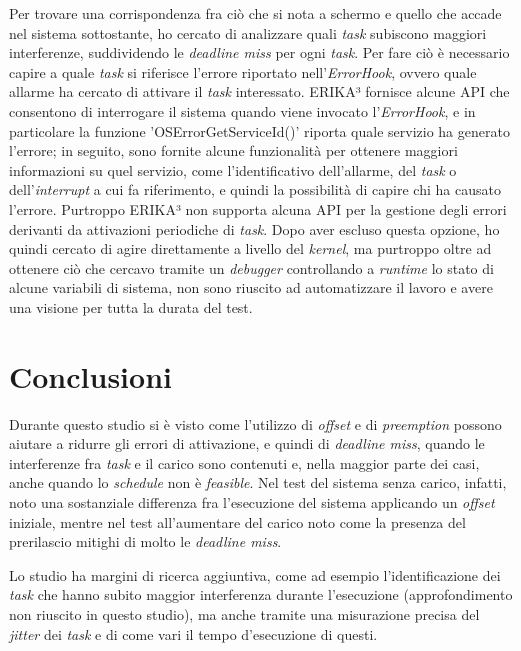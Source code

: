 \documentclass{article}
\begin{document}
Per trovare una corrispondenza fra ciò che si nota a schermo e quello che accade nel sistema sottostante, ho cercato di analizzare quali \textit{task} subiscono maggiori interferenze, suddividendo le \textit{deadline miss} per ogni \textit{task}. 
Per fare ciò è necessario capire a quale \textit{task} si riferisce l'errore riportato nell'\textit{ErrorHook}, ovvero quale allarme ha cercato di attivare il \textit{task} interessato. ERIKA³ fornisce alcune API che consentono di interrogare il sistema quando viene invocato l'\textit{ErrorHook}, e in particolare la funzione 'OSErrorGetServiceId()' riporta quale servizio ha generato l'errore; in seguito, sono fornite alcune funzionalità per ottenere maggiori informazioni su quel servizio, come l'identificativo dell'allarme, del \textit{task} o dell'\textit{interrupt} a cui fa riferimento, e quindi la possibilità di capire chi ha causato l'errore. Purtroppo ERIKA³ non supporta alcuna API per la gestione degli errori derivanti da attivazioni periodiche di \textit{task}. Dopo aver escluso questa opzione, ho quindi cercato di agire direttamente a livello del \textit{kernel}, ma purtroppo oltre ad ottenere ciò che cercavo tramite un \textit{debugger} controllando a \textit{runtime} lo stato di alcune variabili di sistema, non sono riuscito ad automatizzare il lavoro e avere una visione per tutta la durata del test.

\section{Conclusioni}
Durante questo studio si è visto come l'utilizzo di \textit{offset} e di \textit{preemption} possono aiutare a ridurre gli errori di attivazione, e quindi di \textit{deadline miss}, quando le interferenze fra \textit{task} e il carico sono contenuti e, nella maggior parte dei casi, anche quando lo \textit{schedule} non è \textit{feasible}. Nel test del sistema senza carico, infatti, noto una sostanziale differenza fra l'esecuzione del sistema applicando un \textit{offset} iniziale, mentre nel test all'aumentare del carico noto come la presenza del prerilascio mitighi di molto le \textit{deadline miss}.

Lo studio ha margini di ricerca aggiuntiva, come ad esempio l'identificazione dei \textit{task} che hanno subito maggior interferenza durante l'esecuzione (approfondimento non riuscito in questo studio), ma anche tramite una misurazione precisa del \textit{jitter} dei \textit{task} e di come vari il tempo d'esecuzione di questi.
\end{document}
